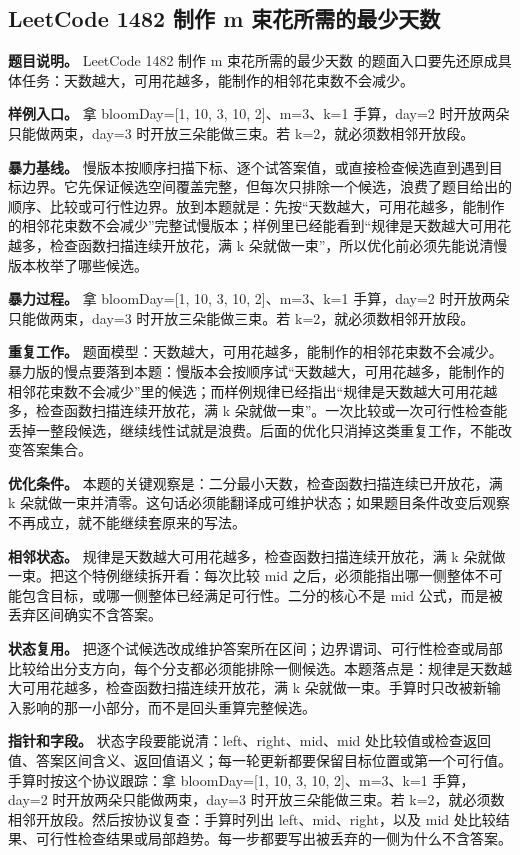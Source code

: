 \subsection{LeetCode 1482 制作 m 束花所需的最少天数}

\textbf{题目说明。} LeetCode 1482 制作 m 束花所需的最少天数 的题面入口要先还原成具体任务：天数越大，可用花越多，能制作的相邻花束数不会减少。

\textbf{样例入口。} 拿 bloomDay=[1, 10, 3, 10, 2]、m=3、k=1 手算，day=2 时开放两朵只能做两束，day=3 时开放三朵能做三束。若 k=2，就必须数相邻开放段。

\textbf{暴力基线。} 慢版本按顺序扫描下标、逐个试答案值，或直接检查候选直到遇到目标边界。它先保证候选空间覆盖完整，但每次只排除一个候选，浪费了题目给出的顺序、比较或可行性边界。放到本题就是：先按“天数越大，可用花越多，能制作的相邻花束数不会减少”完整试慢版本；样例里已经能看到“规律是天数越大可用花越多，检查函数扫描连续开放花，满 k 朵就做一束”，所以优化前必须先能说清慢版本枚举了哪些候选。

\textbf{暴力过程。} 拿 bloomDay=[1, 10, 3, 10, 2]、m=3、k=1 手算，day=2 时开放两朵只能做两束，day=3 时开放三朵能做三束。若 k=2，就必须数相邻开放段。

\textbf{重复工作。} 题面模型：天数越大，可用花越多，能制作的相邻花束数不会减少。暴力版的慢点要落到本题：慢版本会按顺序试“天数越大，可用花越多，能制作的相邻花束数不会减少”里的候选；而样例规律已经指出“规律是天数越大可用花越多，检查函数扫描连续开放花，满 k 朵就做一束”。一次比较或一次可行性检查能丢掉一整段候选，继续线性试就是浪费。后面的优化只消掉这类重复工作，不能改变答案集合。

\textbf{优化条件。} 本题的关键观察是：二分最小天数，检查函数扫描连续已开放花，满 k 朵就做一束并清零。这句话必须能翻译成可维护状态；如果题目条件改变后观察不再成立，就不能继续套原来的写法。

\textbf{相邻状态。} 规律是天数越大可用花越多，检查函数扫描连续开放花，满 k 朵就做一束。把这个特例继续拆开看：每次比较 mid 之后，必须能指出哪一侧整体不可能包含目标，或哪一侧整体已经满足可行性。二分的核心不是 mid 公式，而是被丢弃区间确实不含答案。

\textbf{状态复用。} 把逐个试候选改成维护答案所在区间；边界谓词、可行性检查或局部比较给出分支方向，每个分支都必须能排除一侧候选。本题落点是：规律是天数越大可用花越多，检查函数扫描连续开放花，满 k 朵就做一束。手算时只改被新输入影响的那一小部分，而不是回头重算完整候选。

\textbf{指针和字段。} 状态字段要能说清：left、right、mid、mid 处比较值或检查返回值、答案区间含义、返回值语义；每一轮更新都要保留目标位置或第一个可行值。手算时按这个协议跟踪：拿 bloomDay=[1, 10, 3, 10, 2]、m=3、k=1 手算，day=2 时开放两朵只能做两束，day=3 时开放三朵能做三束。若 k=2，就必须数相邻开放段。然后按协议复查：手算时列出 left、mid、right，以及 mid 处比较结果、可行性检查结果或局部趋势。每一步都要写出被丢弃的一侧为什么不含答案。

